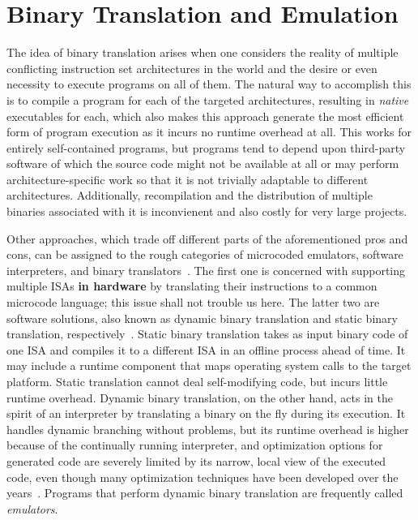\section{Binary Translation and Emulation}

The idea of binary translation arises when one considers the reality of multiple conflicting instruction set
architectures in the world and the desire or even necessity to execute programs on all of them. The natural way to
accomplish this is to compile a program for each of the targeted architectures, resulting in \textit{native} executables
for each, which also makes this approach generate the most efficient form of program execution as it incurs no runtime
overhead at all. This works for entirely self-contained programs, but programs tend to depend upon third-party software
of which the source code might not be available at all or may perform architecture-specific work so that it is not
trivially adaptable to different architectures. Additionally, recompilation and the distribution of multiple binaries
associated with it is inconvienent and also costly for very large projects.

Other approaches, which trade off different parts of the aforementioned pros and cons, can be assigned to the rough
categories of microcoded emulators, software interpreters, and binary translators~\cite{sites1993binary}. The first one
is concerned with supporting multiple \ac{ISA}s \textbf{in hardware} by translating their instructions to a common
microcode language; this issue shall not trouble us here. The latter two are software solutions, also known as dynamic
binary translation and static binary translation, respectively~\cite{cifuentes1996staticdynamic, Rocha2022Lasagne}.
Static binary translation takes as input binary code of one \ac{ISA} and compiles it to a different \ac{ISA} in an
offline process ahead of time. It may include a runtime component that maps operating system calls to the target
platform. Static translation cannot deal self-modifying code, but incurs little runtime overhead. Dynamic binary
translation, on the other hand, acts in the spirit of an interpreter by translating a binary on the fly during its
execution. It handles dynamic branching without problems, but its runtime overhead is higher because of the continually
running interpreter, and optimization options for generated code are severely limited by its narrow, local view of the
executed code, even though many optimization techniques have been developed over the
years~\cite{Guan+2010DbtOptimizations, Sun+2023DbtBranchPred, Hawkins2015OptimizingDbt, Kedia+2013DbtKernel}. Programs
that perform dynamic binary translation are frequently called \textit{emulators}.
